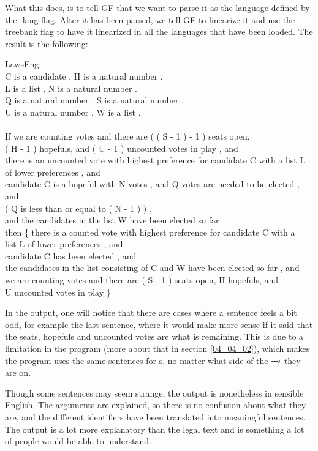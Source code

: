 What this does, is to tell GF that we want to parse it as the language defined by the -lang flag. After it has been parsed, we tell GF to linearize it  and use the -treebank flag to have it linearized in all the languages that have been loaded. The result is the following:

\begin{texto2}
LawsEng: \\
C is a candidate . H is a natural number . \\
L is a list . N is a natural number . \\
Q is a natural number . S is a natural number . \\
U is a natural number . W is a list .\\\\
If we are counting votes and there are ( ( S - 1 ) - 1 ) seats open, \\
( H - 1 ) hopefuls, and ( U - 1 ) uncounted votes in play , and \\
there is an uncounted vote with highest preference for candidate C with a list L \\
of lower preferences , and \\
candidate C is a hopeful with N votes , and Q votes are needed to be elected , and \\
( Q is less than or equal to ( N - 1 ) ) , \\
and the candidates in the list W have been elected so far \\
then \{ there is a counted vote with highest preference for candidate C with a \\
list L of lower preferences , and \\
candidate C has been elected , and \\
the candidates in the list consisting of C and W have been elected so far , and \\
we are counting votes and there are ( S - 1 ) seats open, H hopefuls, and \\
U uncounted votes in play \}
\end{texto2}

In the output, one will notice that there are cases where a sentence feels a bit odd, for example the last sentence, where it would make more sense if it said that the seats, hopefuls and uncounted votes are what is remaining. This is due to a limitation in the program (more about that in section \ref{04_04_02}), which makes the program uses the same sentences for s, no matter what side of the $\multimap$ they are on.

Though some sentences may seem strange, the output is nonetheless in sensible English. The arguments are explained, so there is no confusion about what they are, and the different identifiers have been translated into meaningful sentences. The output is a lot more explanatory than the legal text and is something a lot of people would be able to understand.